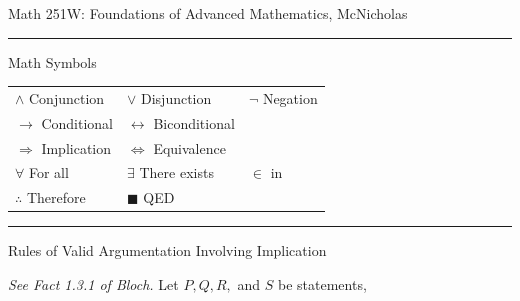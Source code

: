 \documentclass{article}
\begin{document}
	\hfill\small{Math 251W: Foundations of Advanced Mathematics, McNicholas}
	\vspace{0.5cm}
	\hrule
	\vspace{0.5cm}

	\centerline{\large{Math Symbols}}
	\vspace{0.25cm}
	\begin{center}
		\begin{tabular}{lll}
			$\wedge$ Conjunction      & $\vee$ Disjunction              & $\neg$ Negation \\
			$\rightarrow$ Conditional & $\leftrightarrow$ Biconditional &                 \\
			$\Rightarrow$ Implication & $\Leftrightarrow$ Equivalence   &                 \\
			$\forall$ For all         & $\exists$ There exists          & $\in$ in        \\
			$\therefore$ Therefore    & $\blacksquare$ QED              &                 \\
		\end{tabular}
	\end{center}
	\vspace{.25cm}

	\hrule
	\vspace{.25cm}

	\centerline{\large{Rules of Valid Argumentation Involving Implication}}

	\vspace{.25cm}

	\emph{See Fact 1.3.1 of Bloch.}
	Let $P, Q, R,$ and $S$ be statements,
\end{document}
